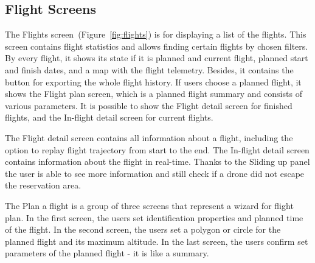 \subsection{Flight Screens}\label{subsec:flight-screens}
The Flights screen~(Figure~\ref{fig:flights}) is for displaying a list of the flights.
This screen contains flight statistics and allows finding certain flights by chosen filters.
By every flight, it shows its state if it is planned and current flight, planned start and finish dates, and a map with the flight telemetry.
Besides, it contains the button for exporting the whole flight history.
If users choose a planned flight, it shows the Flight plan screen, which is a planned flight summary and consists of various parameters.
It is possible to show the Flight detail screen for finished flights, and the In-flight detail screen for current flights.

The Flight detail screen contains all information about a flight, including the option to replay flight trajectory from start to the end.
The In-flight detail screen contains information about the flight in real-time.
Thanks to the Sliding up panel the user is able to see more information and still check if a drone did not escape the reservation area.

The Plan a flight is a group of three screens that represent a wizard for flight plan.
In the first screen, the users set identification properties and planned time of the flight.
In the second screen, the users set a polygon or circle for the planned flight and its maximum altitude.
In the last screen, the users confirm set parameters of the planned flight - it is like a summary.


